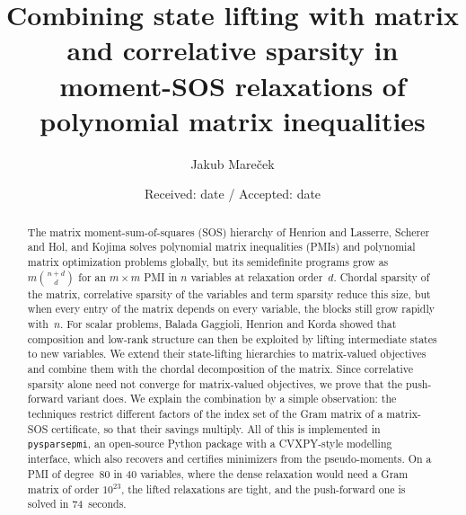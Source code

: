 \documentclass[smallextended]{svjour3}
\newcommand{\code}[1]{\texttt{#1}}
\begin{document}
\title{Combining state lifting with matrix and correlative sparsity in
moment-SOS relaxations of polynomial matrix inequalities}


\author{Jakub Mare\v{c}ek}


\date{Received: date / Accepted: date}

\maketitle

\begin{abstract}
The matrix moment-sum-of-squares (SOS) hierarchy of Henrion and Lasserre,
Scherer and Hol, and Kojima solves polynomial matrix inequalities (PMIs) and
polynomial matrix optimization problems globally, but its semidefinite
programs grow as $m\binom{n+d}{d}$ for an $m\times m$ PMI in $n$ variables
at relaxation order~$d$. Chordal sparsity of the matrix, correlative sparsity
of the variables and term sparsity reduce this size, but when every entry of
the matrix depends on every variable, the blocks still grow rapidly with~$n$. For scalar
problems, Balada Gaggioli, Henrion and Korda showed that composition and
low-rank structure can then be exploited by lifting intermediate states to
new variables. We extend their state-lifting hierarchies to matrix-valued
objectives and combine them with the chordal decomposition of the matrix.
Since correlative sparsity alone need not converge for matrix-valued
objectives, we prove that the push-forward variant does. We explain the
combination by a simple observation: the techniques restrict different
factors of the index set of the Gram matrix of a matrix-SOS certificate, so
that their savings multiply. All of this is implemented in \code{pysparsepmi}, an open-source Python package
with a CVXPY-style modelling interface, which also recovers and certifies
minimizers from the pseudo-moments. On a PMI of degree~$80$ in $40$
variables, where the dense relaxation would need a Gram matrix of order
$10^{23}$, the lifted relaxations are tight, and the push-forward one is
solved in 74~seconds.
\end{abstract}
\end{document}
